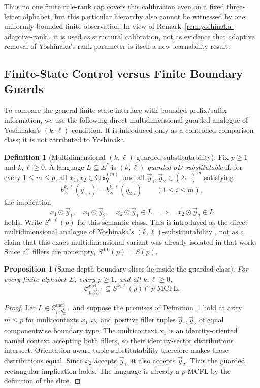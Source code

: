 \documentclass[11pt,a4paper]{article}
\numberwithin{equation}{section}
\theoremstyle{plain}
\newtheorem{proposition}[theorem]{Proposition}
\theoremstyle{definition}
\newtheorem{definition}[theorem]{Definition}
\theoremstyle{remark}
\newcommand{\Cmcf}[2]{\mathcal{C}^{\mathrm{mcf}}_{#1,#2}}
\newcommand{\tuple}[1]{\vec{#1}}
\begin{document}
Thus no one finite rule-rank cap covers this calibration even on a fixed
three-letter alphabet, but this particular hierarchy also cannot be witnessed
by one uniformly bounded finite observation.  In view of
Remark~\ref{rem:yoshinaka-adaptive-rank}, it is used as structural calibration,
not as evidence that adaptive removal of Yoshinaka's rank parameter is itself
a new learnability result.

\subsection{Finite-State Control versus Finite Boundary Guards}

To compare the general finite-state interface with bounded prefix/suffix
information, we use the following direct multidimensional guarded analogue of
Yoshinaka's $(k,\ell)$ condition.  It is introduced only as a controlled
comparison class; it is not attributed to Yoshinaka.

\begin{definition}[Multidimensional \((k,\ell)\)-guarded substitutability]
\label{def:guarded-pd-substitutability}
Fix \(p\ge1\) and \(k,\ell\ge0\).  A language \(L\subseteq\Sigma^*\) is
\emph{\((k,\ell)\)-guarded \(p\)D-substitutable} if, for every
\(1\le m\le p\), all \(x_1,x_2\in\mathsf{Ctx}_{\mathrm Y}^{(m)}\), and all
\(\tuple y_1,\tuple y_2\in(\Sigma^+)^m\) satisfying
\[
  b_\Sigma^{k,\ell}(y_{1,i})=b_\Sigma^{k,\ell}(y_{2,i})
  \qquad(1\le i\le m),
\]
the implication
\[
 x_1\odot\tuple y_1,\quad x_1\odot\tuple y_2,\quad
 x_2\odot\tuple y_1\in L
 \quad\Longrightarrow\quad
 x_2\odot\tuple y_2\in L
\]
holds.  Write \(S^{k,\ell}(p)\) for this semantic class.  This is introduced
as the direct multidimensional analogue of Yoshinaka's
\((k,\ell)\)-substitutability \cite{Yoshinaka2008}, not as a claim that this
exact multidimensional variant was already isolated in that work.  Since all
fillers are nonempty, \(S^{0,0}(p)=S(p)\).
\end{definition}


\begin{proposition}[Same-depth boundary slices lie inside the guarded class]
\label{prop:same-depth-guarded-converse}
For every finite alphabet $\Sigma$, every $p\ge1$, and all $k,\ell\ge0$,
\[
  \Cmcf{p}{b_\Sigma^{k,\ell}}
  \subseteq
  S^{k,\ell}(p)\cap p\text{-}\mathrm{MCFL}.
\]
\end{proposition}

\begin{proof}
Let $L\in\Cmcf{p}{b_\Sigma^{k,\ell}}$ and suppose the premises of
Definition~\ref{def:guarded-pd-substitutability} hold at arity $m\le p$ for
multicontexts $x_1,x_2$ and positive filler tuples
$\tuple y_1,\tuple y_2$ of equal componentwise boundary type.  The
multicontext $x_1$ is an identity-oriented named context accepting both
fillers, so their identity-sector distributions intersect.  Orientation-aware
tuple substitutability therefore makes those distributions equal.  Since
$x_2$ accepts $\tuple y_1$, it also accepts $\tuple y_2$.  Thus the guarded
rectangular implication holds.  The language is already a $p$-MCFL by the
definition of the slice.
\end{proof}
\end{document}
